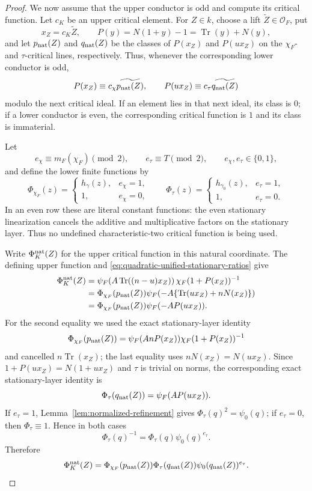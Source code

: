 \documentclass[11pt]{amsart}
\theoremstyle{definition}
\theoremstyle{remark}
\newcommand{\cO}{\mathcal O}
\newcommand{\Tr}{\operatorname{Tr}}
\begin{document}
\begin{proof}
We now assume that the upper conductor is odd and compute its critical
function.  Let $c_K$ be an upper critical element.  For $Z\in k$, choose a
lift $\widetilde Z\in\cO_F$, put
\[
 x_Z=c_K\widetilde Z,
 \qquad P(y)=N(1+y)-1=\Tr(y)+N(y),
\]
and let $p_{\rm nat}(Z)$ and $q_{\rm nat}(Z)$ be the classes of
$P(x_Z)$ and $P(ux_Z)$ on the $\chi_F$- and $\tau$-critical lines,
respectively.  Thus, whenever the corresponding lower conductor is
odd,
\[
 P(x_Z)\equiv c_\chi\widetilde{p_{\rm nat}(Z)},
 \qquad
 P(ux_Z)\equiv c_\tau\widetilde{q_{\rm nat}(Z)}
\]
modulo the next critical ideal.  If an element lies in that next ideal,
its class is $0$; if a lower conductor is even, the corresponding
critical function is $1$ and its class is immaterial.

Let
\[
 e_\chi\equiv m_F(\chi_F)\pmod2,
 \qquad e_\tau\equiv T\pmod2,
 \qquad e_\chi,e_\tau\in\{0,1\},
\]
and define the lower finite functions by
\[
 \Phi_{\chi_F}(z)=
 \begin{cases}
  h_\gamma(z),&e_\chi=1,\\
  1,&e_\chi=0,
 \end{cases}
 \qquad
 \Phi_\tau(z)=
 \begin{cases}
  h_{\gamma_0}(z),&e_\tau=1,\\
  1,&e_\tau=0.
 \end{cases}
\]
In an even row these are literal constant functions: the even
stationary linearization cancels the additive and multiplicative
factors on the stationary layer.  Thus no undefined characteristic-two
critical function is being used.

Write $\Phi_K^{\rm nat}(Z)$ for the upper critical function in this
natural coordinate.  The defining upper function and
\eqref{eq:quadratic-unified-stationary-ratios} give
\begin{align*}
 \Phi_K^{\rm nat}(Z)
 &=\psi_F\!\left(A\Tr((n-u)x_Z)\right)
   \chi_F(1+P(x_Z))^{-1}\\
 &=\Phi_{\chi_F}(p_{\rm nat}(Z))
   \psi_F\!\left(-A\{\Tr(ux_Z)+nN(x_Z)\}\right)\\
 &=\Phi_{\chi_F}(p_{\rm nat}(Z))\psi_F(-AP(ux_Z)).
\end{align*}
For the second equality we used the exact stationary-layer identity
\[
 \Phi_{\chi_F}(p_{\rm nat}(Z))
 =\psi_F(AnP(x_Z))\chi_F(1+P(x_Z))^{-1}
\]
and cancelled $n\Tr(x_Z)$; the last equality uses
$nN(x_Z)=N(ux_Z)$.  Since
$1+P(ux_Z)=N(1+ux_Z)$ and $\tau$ is trivial on norms, the corresponding
exact stationary-layer identity is
\[
 \Phi_\tau(q_{\rm nat}(Z))=\psi_F(AP(ux_Z)).
\]
If $e_\tau=1$, Lemma~\ref{lem:normalized-refinement} gives
$\Phi_\tau(q)^2=\psi_0(q)$; if $e_\tau=0$, then
$\Phi_\tau\equiv1$.  Hence in both cases
\[
 \Phi_\tau(q)^{-1}
 =\Phi_\tau(q)\psi_0(q)^{e_\tau}.
\]
Therefore
\begin{equation}\label{eq:quadratic-exact-transport-natural}
 \Phi_K^{\rm nat}(Z)
 =\Phi_{\chi_F}(p_{\rm nat}(Z))
  \Phi_\tau(q_{\rm nat}(Z))
  \psi_0(q_{\rm nat}(Z))^{e_\tau}.
\end{equation}


\end{proof}
\end{document}
